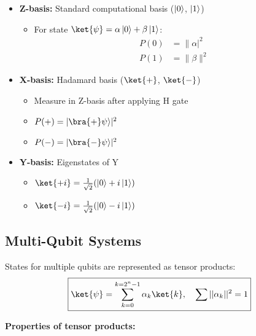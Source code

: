   \begin{itemize}
    \item \textbf{Z-basis:} Standard computational basis ($\left|0\right\rangle$, $\left|1\right\rangle$)

      \begin{itemize}[label={*}]
        \item For state $\ket{\psi} = \alpha\zero + \beta\one$:
          \begin{align*}
            P(0) &= \|\alpha|^2 \\
            P(1) &= \|\beta\|^2
          \end{align*}
      \end{itemize}

    \item \textbf{X-basis:} Hadamard basis ($\ket{+}$, $\ket{-}$)

      \begin{itemize}[label={*}]
        \item Measure in Z-basis after applying H gate

        \item $P(+) = |\bra{+}\psi\rangle|^2$

        \item $P(-) = |\bra{-}\psi\rangle|^2$
      \end{itemize}

    \item \textbf{Y-basis:} Eigenstates of Y

      \begin{itemize}[label={*}]
        \item $\ket{+i} = \frac{1}{\sqrt{2}}(\zero + i\one)$

        \item $\ket{-i} = \frac{1}{\sqrt{2}}(\zero - i\one)$
      \end{itemize}

  \end{itemize}


  \subsection*{Multi-Qubit Systems}

  States for multiple qubits are represented as
  tensor products:
  \[
    \boxed{
      \ket{\psi} = \sum_{k=0}^{k = 2^n-1} \alpha_k \ket{k}, \quad \sum
      ||\alpha_k||^2 = 1
    }
  \]

  \noindent
  \textbf{Properties of tensor products:}

